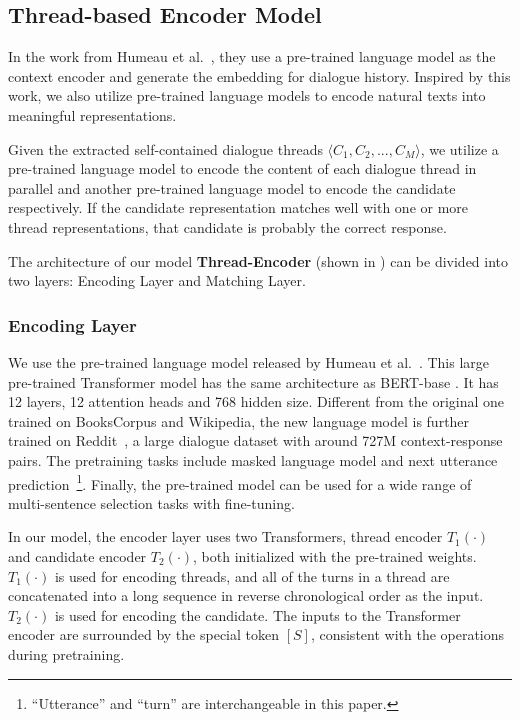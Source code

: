 \subsection{Thread-based Encoder Model}
\label{sec:tem}
In the work from Humeau et al.~, they use a pre-trained language model as the context encoder and generate the embedding for dialogue history. Inspired by this work, we also utilize pre-trained language models to encode natural texts into meaningful representations.

Given the extracted self-contained dialogue threads $\langle C_1, C_2, ..., C_M \rangle$, we utilize a pre-trained language model to encode the content of each dialogue thread in parallel and another pre-trained language model to encode the candidate respectively. 
If the candidate representation matches well with one or more thread representations, 
that candidate is probably the correct response. 

The architecture of our model \textbf{Thread-Encoder} (shown in ) can be divided into two layers: Encoding Layer and Matching Layer.

\subsubsection{Encoding Layer}
We use the pre-trained language model released by Humeau et al.~. This large pre-trained Transformer model has the same architecture as BERT-base \cite{DevlinCLT19}. It has 12 layers, 12 attention heads and 768 hidden size. Different from the original one trained on BooksCorpus and Wikipedia, the new language model is further trained on Reddit~\cite{abs-1904-06472}, a large dialogue dataset with around 727M context-response pairs. The pretraining tasks include masked language model and next utterance prediction~\footnote{``Utterance'' and ``turn'' are 
interchangeable in this paper.}. Finally, the pre-trained model can be used for 
a wide range of multi-sentence selection tasks with fine-tuning.

In our model, the encoder layer uses two Transformers, thread encoder $T_1(\cdot)$ and candidate encoder $T_2(\cdot)$, both initialized with the pre-trained weights. $T_1(\cdot)$ is used for encoding threads, and all of the turns in a thread are concatenated into a long sequence in reverse chronological order as the input. 
$T_2(\cdot)$ is used for encoding the candidate. The inputs to the 
Transformer encoder are surrounded by the special token $[S]$, 
consistent with the operations during pretraining.

